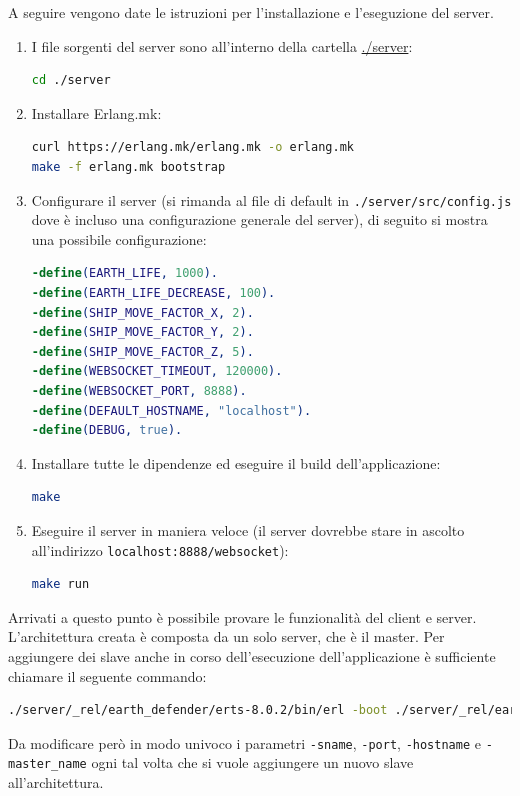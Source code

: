 \documentclass[paper=a4, fontsize=11pt]{scrartcl} %
\numberwithin{equation}{section} %
\numberwithin{figure}{section} %
\numberwithin{table}{section} %
\begin{document}
A seguire vengono date le istruzioni per l'installazione e l'eseguzione del server.
\begin{enumerate}
\item
I file sorgenti del server sono all'interno della cartella \url{./server}:
\begin{lstlisting}[language=bash]
cd ./server
\end{lstlisting}

\item
Installare Erlang.mk:
\begin{lstlisting}[language=bash]
curl https://erlang.mk/erlang.mk -o erlang.mk
make -f erlang.mk bootstrap
\end{lstlisting}

\item
Configurare il server (si rimanda al file di default in \texttt{./server/src/config.js} dove è incluso una configurazione generale del server), di seguito si mostra una possibile configurazione:
\begin{lstlisting}[language=erlang]
-define(EARTH_LIFE, 1000).
-define(EARTH_LIFE_DECREASE, 100).
-define(SHIP_MOVE_FACTOR_X, 2).
-define(SHIP_MOVE_FACTOR_Y, 2).
-define(SHIP_MOVE_FACTOR_Z, 5).
-define(WEBSOCKET_TIMEOUT, 120000).
-define(WEBSOCKET_PORT, 8888).
-define(DEFAULT_HOSTNAME, "localhost").
-define(DEBUG, true).

\end{lstlisting}

\item
Installare tutte le dipendenze ed eseguire il build dell'applicazione:
\begin{lstlisting}[language=bash]
make
\end{lstlisting}

\item
Eseguire il server in maniera veloce (il server dovrebbe stare in ascolto all'indirizzo \texttt{localhost:8888/websocket}):
\begin{lstlisting}[language=bash]
make run
\end{lstlisting}
\end{enumerate}

Arrivati a questo punto è possibile provare le funzionalità del client e server.
L'architettura creata è composta da un solo server, che è il master. Per aggiungere dei slave anche in corso dell'esecuzione dell'applicazione è sufficiente
chiamare il seguente commando:
\begin{lstlisting}[language=bash]
./server/_rel/earth_defender/erts-8.0.2/bin/erl -boot ./server/_rel/earth_defender/releases/1.0.0/earth_defender -sname 'ketchup' -setcookie 'earth_defender' -port 8889 -hostname "localhost" -role slave -master_name earth_defender@host
\end{lstlisting}
Da modificare però in modo univoco i parametri \texttt{-sname}, \texttt{-port}, \texttt{-hostname} e \texttt{-master\_name} ogni tal volta che si
vuole aggiungere un nuovo slave all'architettura.



\end{document}
